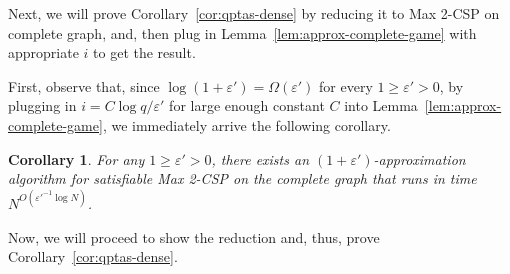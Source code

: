 \documentclass{article}
\newtheorem{corollary}{Corollary}
\begin{document}
Next, we will prove Corollary~\ref{cor:qptas-dense} by reducing it to {\sc Max 2-CSP} on complete graph, and, then plug in Lemma~\ref{lem:approx-complete-game} with appropriate $i$ to get the result.

First, observe that, since $\log(1 + \varepsilon') = \Omega(\varepsilon')$ for every $1 \geq \varepsilon' > 0$, by plugging in $i = C \log q/\varepsilon'$ for large enough constant $C$ into Lemma~\ref{lem:approx-complete-game}, we immediately arrive the following corollary. \\

\begin{corollary} \label{cor:qptas-complete}
  For any $1 \geq \varepsilon' > 0$, there exists an $(1 + \varepsilon')$-approximation algorithm for satisfiable {\sc Max 2-CSP} on the complete graph that runs in time $N^{O(\varepsilon'^{-1}\log N)}$.
\end{corollary}

Now, we will proceed to show the reduction and, thus, prove Corollary~\ref{cor:qptas-dense}.
\end{document}
